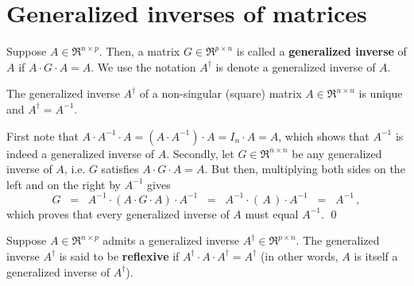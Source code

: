 

\section{Generalized inverses of matrices}
\setcounter{theorem}{0}
\setcounter{equation}{0}

\renewcommand{\theenumi}{\roman{enumi}}
\renewcommand{\labelenumi}{\textnormal{(\theenumi)}$\;\;$}


\begin{definition}
\mbox{}\vskip 0.1cm\noindent
Suppose $A \in \Re^{n \times p}$.
Then, a matrix $G \in \Re^{p \times n}$ is called a
\textbf{generalized inverse} of $A$ if
$A\cdot G\cdot A = A$.
We use the notation $A^{\dagger}$ is denote
a generalized inverse of $A$.
\end{definition}

\begin{proposition}
\mbox{}\vskip 0.1cm\noindent
The generalized inverse $A^{\dagger}$ of a non-singular (square) matrix $A \in \Re^{n \times n}$
is unique and $A^{\dagger} = A^{-1}$. 
\end{proposition}
\proof
First note that $A \cdot A^{-1} \cdot A = (A \cdot A^{-1}) \cdot A = I_{n} \cdot A = A$,
which shows that $A^{-1}$ is indeed a generalized inverse of $A$.
Secondly, let $G \in \Re^{n \times n}$ be any generalized inverse of $A$, i.e.
$G$ satisfies $A \cdot G \cdot A = A$.
But then, multiplying both sides on the left and on the right by $A^{-1}$ gives
\begin{equation*}
G \;\; = \;\; A^{-1} \cdot (A \cdot G \cdot A) \cdot A^{-1}  
	\;\; = \;\; A^{-1} \cdot (\,A\,) \cdot A^{-1}  
	\;\; = \;\; A^{-1}\,,
\end{equation*}
which proves that every generalized inverse of $A$ must equal $A^{-1}$.
\qed

\begin{definition}
\mbox{}\vskip 0.1cm\noindent
Suppose $A \in \Re^{n \times p}$ admits a generalized inverse $A^{\dagger} \in \Re^{p \times n}$.
The generalized inverse $A^{\dagger}$ is said to be \textbf{reflexive} if
$A^{\dagger} \cdot A \cdot A^{\dagger} = A^{\dagger}$ (in other words,
$A$ is itself a generalized inverse of $A^{\dagger}$).
\end{definition}

